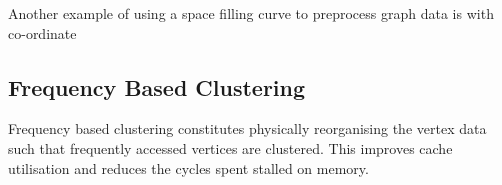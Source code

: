 Another example of using a space filling curve to preprocess graph data is with co-ordinate 

\subsection{Frequency Based Clustering}

Frequency based clustering constitutes physically reorganising the vertex data such that frequently
accessed vertices are clustered. This improves cache utilisation and reduces the cycles spent stalled
on memory.
